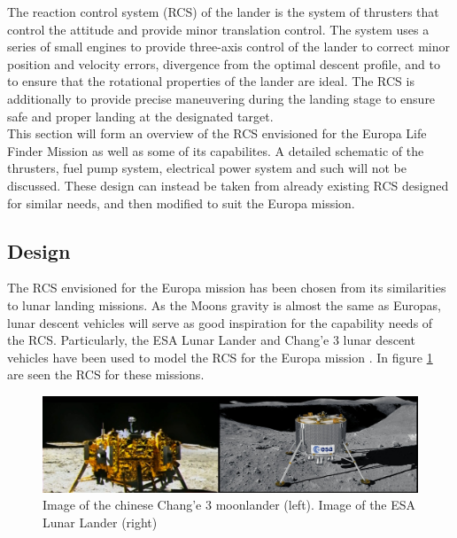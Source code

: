 \label{chap:RCS}

The reaction control system (RCS) of the lander is the system of thrusters that control the attitude and provide minor translation control. The system uses a series of small engines to provide three-axis control of the lander to correct minor position and velocity errors, divergence from the optimal descent profile, and to to ensure that the rotational properties of the lander are ideal. The RCS is additionally to provide precise maneuvering during the landing stage to ensure safe and proper landing at the designated target.\\

\noindent
This section will form an overview of the RCS envisioned for the Europa Life Finder Mission as well as some of its capabilites. A detailed schematic of the thrusters, fuel pump system, electrical power system and such will not be discussed. These design can instead be taken from already existing RCS designed for similar needs, and then modified to suit the Europa mission.

\subsection{Design}

The RCS envisioned for the Europa mission has been chosen from its similarities to lunar landing missions. As the Moons gravity is almost the same as Europas, lunar descent vehicles will serve as good inspiration for the capability needs of the RCS. Particularly, the ESA Lunar Lander and Chang'e 3 lunar descent vehicles have been used to model the RCS for the Europa mission \cite{ESA_pic} \cite{Chang_e_3}. In figure \ref{fig:landers} are seen the RCS for these missions.\\

\begin{figure}[htb]
\begin{center}
\includegraphics[scale=0.19]{figures/RCS/landers}
\caption{Image of the chinese Chang'e 3 moonlander (left). Image of the ESA Lunar Lander (right) \cite{Chang_pic} \cite{ESA_pic}}
\label{fig:landers}
\end{center}
\end{figure}

